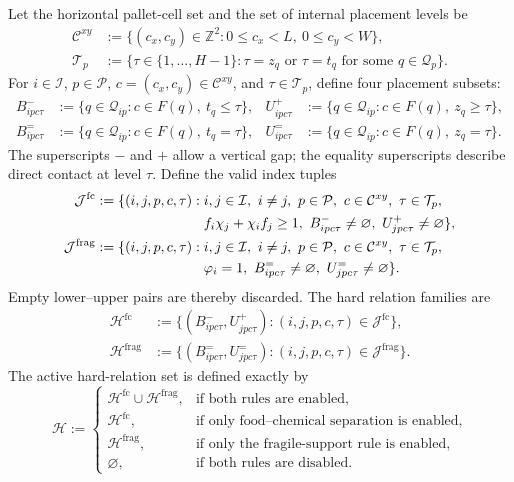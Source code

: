 \documentclass[11pt]{article}
\newcommand{\Item}{\mathcal{I}}
\newcommand{\Pallet}{\mathcal{P}}
\newcommand{\Place}{\mathcal{Q}}
\newcommand{\Cell}{\mathcal{C}}
\begin{document}
Let the horizontal pallet-cell set and the set of internal placement levels be
\begin{align}
  \Cell^{xy}&:=\{(c_x,c_y)\in\mathbb Z^2:0\le c_x<L,\ 0\le c_y<W\},\\
  \mathcal T_p&:=\{\tau\in\{1,\ldots,H-1\}:\tau=z_q\text{ or }\tau=t_q
                    \text{ for some }q\in\Place_p\}.
  \label{eq:column-index-sets}
\end{align}
For $i\in\Item$, $p\in\Pallet$, $c=(c_x,c_y)\in\Cell^{xy}$, and
$\tau\in\mathcal T_p$, define four placement subsets:
\begin{align}
  B^-_{i p c\tau}&:=\{q\in\Place_{ip}:c\in F(q),\ t_q\le\tau\},&
  U^+_{i p c\tau}&:=\{q\in\Place_{ip}:c\in F(q),\ z_q\ge\tau\},\\
  B^=_{i p c\tau}&:=\{q\in\Place_{ip}:c\in F(q),\ t_q=\tau\},&
  U^=_{i p c\tau}&:=\{q\in\Place_{ip}:c\in F(q),\ z_q=\tau\}.
  \label{eq:column-placement-sets}
\end{align}
The superscripts $-$ and $+$ allow a vertical gap; the equality superscripts
describe direct contact at level $\tau$.  Define the valid index tuples
\begin{align}
  \mathcal J^{\mathrm{fc}}:=\{(i,j,p,c,\tau):{}&i,j\in\Item,\ i\ne j,
  \ p\in\Pallet,\ c\in\Cell^{xy},\ \tau\in\mathcal T_p,\notag\\
  &f_i\chi_j+\chi_i f_j\ge1,\ B^-_{i p c\tau}\ne\varnothing,
  \ U^+_{j p c\tau}\ne\varnothing\},\\
  \mathcal J^{\mathrm{frag}}:=\{(i,j,p,c,\tau):{}&i,j\in\Item,\ i\ne j,
  \ p\in\Pallet,\ c\in\Cell^{xy},\ \tau\in\mathcal T_p,\notag\\
  &\varphi_i=1,\ B^=_{i p c\tau}\ne\varnothing,
  \ U^=_{j p c\tau}\ne\varnothing\}.
  \label{eq:hard-relation-indices}
\end{align}
Empty lower--upper pairs are thereby discarded.  The hard relation families
are
\begin{align}
  \mathcal H^{\mathrm{fc}}&:=
  \{(B^-_{i p c\tau},U^+_{j p c\tau}):(i,j,p,c,\tau)\in
  \mathcal J^{\mathrm{fc}}\},\\
  \mathcal H^{\mathrm{frag}}&:=
  \{(B^=_{i p c\tau},U^=_{j p c\tau}):(i,j,p,c,\tau)\in
  \mathcal J^{\mathrm{frag}}\}.
  \label{eq:hard-relation-families}
\end{align}
The active hard-relation set is defined exactly by
\begin{equation}
  \mathcal H:=
  \begin{cases}
    \mathcal H^{\mathrm{fc}}\cup\mathcal H^{\mathrm{frag}},
      &\text{if both rules are enabled},\\
    \mathcal H^{\mathrm{fc}},
      &\text{if only food--chemical separation is enabled},\\
    \mathcal H^{\mathrm{frag}},
      &\text{if only the fragile-support rule is enabled},\\
    \varnothing,&\text{if both rules are disabled}.
  \end{cases}
  \label{eq:active-hard-relations}
\end{equation}
\end{document}
